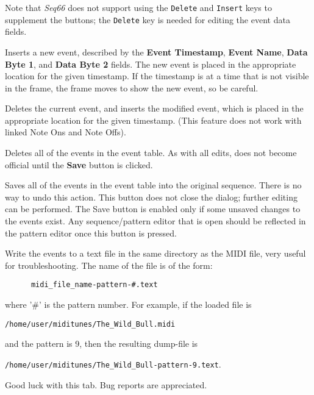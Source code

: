    Note that
   \textsl{Seq66} does not support using the
   \texttt{Delete} and \texttt{Insert} keys to
   supplement the buttons; the \texttt{Delete}
   key is needed for editing the event data fields.

   \setcounter{ItemCounter}{0}      %

   Inserts a new event, described by the 
   \textbf{Event Timestamp},
   \textbf{Event Name},
   \textbf{Data Byte 1}, and
   \textbf{Data Byte 2} fields.
   The new event is placed in the appropriate location for the given timestamp.
   If the timestamp is at a time that is not visible in the frame, the frame
   moves to show the new event, so be careful.

   Deletes the current event, and inserts the modified event,
   which is placed in the appropriate location for the given
   timestamp.  (This feature does not work with linked Note Ons and Note Offs).

   Deletes all of the events in the event table.
   As with all edits, does not become official until the \textbf{Save} button
   is clicked.

   Saves all of the events in the event table into the original sequence.
   There is no way to undo this action.
   This button does not close the dialog; further
   editing can be performed.  The Save button is enabled only if
   some unsaved changes to the events exist.
   Any sequence/pattern editor that is open should be reflected
   in the pattern editor once this button is pressed.

   Write the events to a text file in the same directory as the MIDI file, very
   useful for troubleshooting.  The name of the file is of the form:

   \begin{verbatim}
      midi_file_name-pattern-#.text
   \end{verbatim}

   where '\#' is the pattern number.  For example, if the loaded file is

   \texttt{/home/user/miditunes/The\_Wild\_Bull.midi}

   and the pattern is 9, then the resulting dump-file is

   \texttt{/home/user/miditunes/The\_Wild\_Bull-pattern-9.text}.

   Good luck with this tab.  Bug reports are appreciated.

